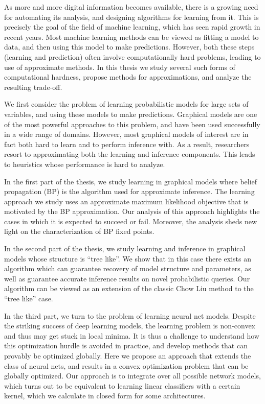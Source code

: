 As more and more digital information becomes available, there is a growing need for automating its analysis, and designing algorithms for learning from it. This is precisely the goal 
of the field of machine learning, which has seen rapid growth in recent years. 
Most machine learning methods can be viewed as fitting a model to data, and then using this model to make predictions. However, both these steps (learning and prediction) often
involve computationally hard problems, leading to use of approximate methods. In this thesis we study several such forms of computational hardness, propose methods
for approximations, and analyze the resulting trade-off.

We first consider the problem of learning probabilistic models for large sets of variables, and using these models to make predictions. Graphical models are one of the most powerful approaches
to this problem, and have been used successfully in a wide range of domains. However, most graphical models of interest are in fact both hard to learn and to perform inference with. As a result,
researchers resort to approximating both the learning and inference components. This leads to heuristics whose performance is hard to analyze.

In the first part of the thesis, we study learning in graphical models where belief propagation (BP) is the algorithm used for approximate inference. The learning approach we study uses
an approximate maximum likelihood objective that is motivated by the BP approximation. Our analysis of this approach highlights the cases in which it is expected to succeed or fail. Moreover,
the analysis sheds new light on the characterization of BP fixed points. 

In the second part of the thesis, we study learning and inference in graphical models whose structure is ``tree like''. We show that in this case there exists an algorithm which can guarantee recovery of model structure and parameters, as well as guarantee accurate inference results on novel probabilistic queries. Our algorithm can be viewed as an extension of the classic Chow Liu method to the ``tree like'' case. 

In the third part, we turn to the problem of learning neural net models. Despite the striking success of deep learning models, the learning problem is non-convex and thus may get stuck in local minima. It is thus a challenge to understand how this optimization hurdle is avoided in practice, and develop methods that can provably be optimized globally. Here we propose an approach that
extends the class of neural nets, and results in a convex optimization problem that can be globally optimized. Our approach is to integrate over all possible network models, which turns out to be equivalent to learning linear classifiers with a certain kernel, which we calculate in closed form for some architectures. 

